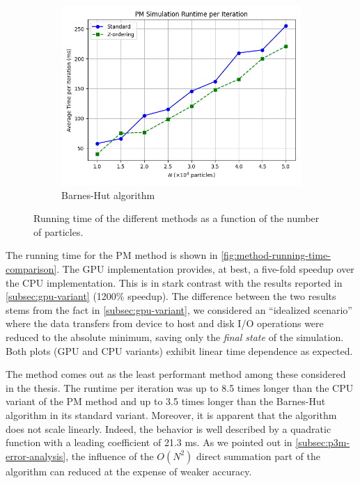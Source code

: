 \begin{figure}[!ht]
    \vspace{1em}

    \begin{subfigure}[b]{0.48\textwidth}
        \centering
        \includegraphics[width=\linewidth]{chapters/results/img/perf/bh_time.png}
        \caption{Barnes-Hut algorithm}
        \label{fig:bh-running-time}
    \end{subfigure}

    \caption{Running time of the different methods as a function of the number of particles.}
    \label{fig:method-running-time-comparison}
\end{figure}

The running time for the PM method is shown in \autoref{fig:method-running-time-comparison}.
The GPU implementation provides, at best, a five-fold speedup over the CPU implementation.
This is in stark contrast with the results reported in \autoref{subsec:gpu-variant} (1200\% speedup).
The difference between the two results stems from the fact in \autoref{subsec:gpu-variant}, we considered an ``idealized scenario'' where the data transfers from device to host and disk I/O operations were reduced to the absolute minimum, saving only the \textit{final state} of the simulation.
Both plots (GPU and CPU variants) exhibit linear time dependence as expected.

The \PThreeM{} method comes out as the least performant method among these considered in the thesis.
The runtime per iteration was up to 8.5 times longer than the CPU variant of the PM method and up to 3.5 times longer than the Barnes-Hut algorithm in its standard variant.
Moreover, it is apparent that the algorithm does not scale linearly.
Indeed, the behavior is well described by a quadratic function with a leading coefficient of 21.3 ms.
As we pointed out in \autoref{subsec:p3m-error-analysis}, the influence of the $O(N^2)$ direct summation part of the algorithm can reduced at the expense of weaker accuracy.

